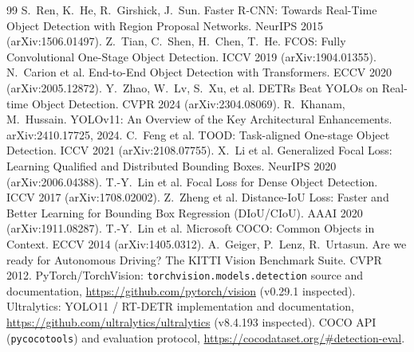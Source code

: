 \documentclass[10pt]{article}
\newcommand{\code}[1]{\texttt{\small #1}}
\begin{document}
\begin{thebibliography}{99}\footnotesize
{} S.~Ren, K.~He, R.~Girshick, J.~Sun. Faster R-CNN: Towards Real-Time Object Detection with Region Proposal Networks. NeurIPS 2015 (arXiv:1506.01497).
 Z.~Tian, C.~Shen, H.~Chen, T.~He. FCOS: Fully Convolutional One-Stage Object Detection. ICCV 2019 (arXiv:1904.01355).
 N.~Carion et al. End-to-End Object Detection with Transformers. ECCV 2020 (arXiv:2005.12872).
 Y.~Zhao, W.~Lv, S.~Xu, et al. DETRs Beat YOLOs on Real-time Object Detection. CVPR 2024 (arXiv:2304.08069).
 R.~Khanam, M.~Hussain. YOLOv11: An Overview of the Key Architectural Enhancements. arXiv:2410.17725, 2024.
 C.~Feng et al. TOOD: Task-aligned One-stage Object Detection. ICCV 2021 (arXiv:2108.07755).
 X.~Li et al. Generalized Focal Loss: Learning Qualified and Distributed Bounding Boxes. NeurIPS 2020 (arXiv:2006.04388).
 T.-Y.~Lin et al. Focal Loss for Dense Object Detection. ICCV 2017 (arXiv:1708.02002).
 Z.~Zheng et al. Distance-IoU Loss: Faster and Better Learning for Bounding Box Regression (DIoU/CIoU). AAAI 2020 (arXiv:1911.08287).
 T.-Y.~Lin et al. Microsoft COCO: Common Objects in Context. ECCV 2014 (arXiv:1405.0312).
 A.~Geiger, P.~Lenz, R.~Urtasun. Are we ready for Autonomous Driving? The KITTI Vision Benchmark Suite. CVPR 2012.
 PyTorch/TorchVision: \code{torchvision.models.detection} source and documentation, \url{https://github.com/pytorch/vision} (v0.29.1 inspected).
 Ultralytics: YOLO11 / RT-DETR implementation and documentation, \url{https://github.com/ultralytics/ultralytics} (v8.4.193 inspected).
 COCO API (\code{pycocotools}) and evaluation protocol, \url{https://cocodataset.org/\#detection-eval}.
\end{thebibliography}

\appendix
\end{document}
